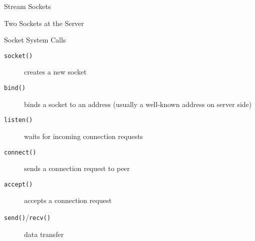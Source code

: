 \begin{frame}{Stream Sockets}
\begin{center}
\end{center}
\end{frame}

\begin{frame}{Two Sockets at the Server}
  \begin{center}
  \end{center}
\end{frame}

\begin{frame}{Socket System Calls}
  \begin{description}
  \item[\texttt{socket()}] creates a new socket
  \item[\texttt{bind()}] binds a socket to an address (usually a well-known address on
    server side)
  \item[\texttt{listen()}] waits for incoming connection requests
  \item[\texttt{connect()}] sends a connection request to peer
  \item[\texttt{accept()}] accepts a connection request
  \item[\texttt{send()}/\texttt{recv()}] data transfer
  \end{description}
\end{frame}


